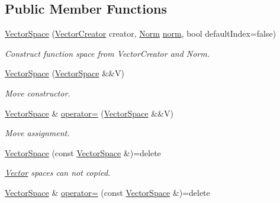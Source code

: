\subsection*{Public Member Functions}
\begin{DoxyCompactItemize}
\item 
\hyperlink{classSpacy_1_1VectorSpace_ad3006f2bbdc767590305c9f939a83c28}{Vector\+Space} (\hyperlink{namespaceSpacy_a94fc7a4b9d3b26ef835e61647fac4d9b}{Vector\+Creator} creator, \hyperlink{namespaceSpacy_a0dbe77a4e1282ef88017e94d50d17791}{Norm} \hyperlink{classSpacy_1_1VectorSpace_a2f26e33994544a37a83e6938a748ab8c}{norm}, bool default\+Index=false)
\begin{DoxyCompactList}\small\item\em Construct function space from Vector\+Creator and Norm. \end{DoxyCompactList}\item 
\hyperlink{classSpacy_1_1VectorSpace_a2bc6444dc35de9fe68d7a8156c03125f}{Vector\+Space} (\hyperlink{classSpacy_1_1VectorSpace}{Vector\+Space} \&\&V)
\begin{DoxyCompactList}\small\item\em Move constructor. \end{DoxyCompactList}\item 
\hyperlink{classSpacy_1_1VectorSpace}{Vector\+Space} \& \hyperlink{classSpacy_1_1VectorSpace_a5c43f6cca9f16ee3839e813633f87370}{operator=} (\hyperlink{classSpacy_1_1VectorSpace}{Vector\+Space} \&\&V)
\begin{DoxyCompactList}\small\item\em Move assignment. \end{DoxyCompactList}\item 
\hypertarget{classSpacy_1_1VectorSpace_ae8f3f22a43fcc418c447b5f49568d54e}{}\hyperlink{classSpacy_1_1VectorSpace_ae8f3f22a43fcc418c447b5f49568d54e}{Vector\+Space} (const \hyperlink{classSpacy_1_1VectorSpace}{Vector\+Space} \&)=delete\label{classSpacy_1_1VectorSpace_ae8f3f22a43fcc418c447b5f49568d54e}

\begin{DoxyCompactList}\small\item\em \hyperlink{classSpacy_1_1Vector}{Vector} spaces can not copied. \end{DoxyCompactList}\item 
\hypertarget{classSpacy_1_1VectorSpace_a30d39a339ed924a6c17c85d75f64afc4}{}\hyperlink{classSpacy_1_1VectorSpace}{Vector\+Space} \& \hyperlink{classSpacy_1_1VectorSpace_a30d39a339ed924a6c17c85d75f64afc4}{operator=} (const \hyperlink{classSpacy_1_1VectorSpace}{Vector\+Space} \&)=delete\label{classSpacy_1_1VectorSpace_a30d39a339ed924a6c17c85d75f64afc4}


\end{DoxyCompactItemize}
